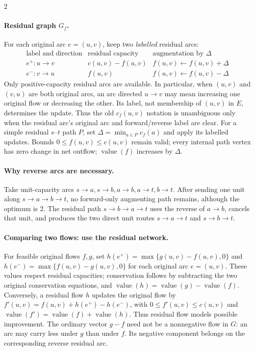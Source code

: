 \documentclass[8pt]{extarticle}
\theoremstyle{definition}
\begin{document}
\begin{multicols*}{2}
\paragraph{Residual graph $G_f$.}
For each original arc $e=(u,v)$, keep two \emph{labelled} residual arcs:
\[
\begin{array}{c|c|c}
\text{label and direction}&\text{residual capacity}&\text{augmentation by }\Delta\\\hline
 e^+:u\to v&c(u,v)-f(u,v)&f(u,v)\gets f(u,v)+\Delta\\
 e^-:v\to u&f(u,v)&f(u,v)\gets f(u,v)-\Delta
\end{array}
\]
Only positive-capacity residual arcs are available. In particular, when
$(u,v)$ and $(v,u)$ are both original arcs, an arc directed $u\to v$ may
mean increasing one original flow or decreasing the other. Its label, not
membership of $(u,v)$ in $E$, determines the update. Thus the old
$c_f(u,v)$ notation is unambiguous only when the residual arc's original
arc and forward/reverse label are clear.
For a simple residual $s$--$t$ path $P$, set
$\Delta=\min_{a\in P}c_f(a)$ and apply its labelled updates.
Bounds $0\le f(u,v)\le c(u,v)$ remain valid; every internal path vertex has
zero change in net outflow; $\operatorname{value}(f)$ increases by $\Delta$.

\paragraph{Why reverse arcs are necessary.}
Take unit-capacity arcs $s\to a,s\to b,a\to b,a\to t,b\to t$.
After sending one unit along $s\to a\to b\to t$, no forward-only
augmenting path remains, although the optimum is 2. The residual path
$s\to b\to a\to t$ uses the reverse of $a\to b$, cancels that unit, and
produces the two direct unit routes $s\to a\to t$ and $s\to b\to t$.

\paragraph{Comparing two flows: use the residual network.}
For feasible original flows $f,g$, set
$h(e^+)=\max\{g(u,v)-f(u,v),0\}$ and
$h(e^-)=\max\{f(u,v)-g(u,v),0\}$ for each original arc $e=(u,v)$.
These values respect residual capacities;
conservation follows by subtracting the two original conservation equations,
and $\operatorname{value}(h)=\operatorname{value}(g)-\operatorname{value}(f)$.
Conversely, a residual flow $h$ updates the original flow by
$f'(u,v)=f(u,v)+h(e^+)-h(e^-)$, with $0\le f'(u,v)\le c(u,v)$ and
$\operatorname{value}(f')=\operatorname{value}(f)+\operatorname{value}(h)$.
Thus residual flow models possible improvement.
The ordinary vector $g-f$ need not be a nonnegative flow in $G$: an arc may
carry less under $g$ than under $f$. Its negative component belongs on the
corresponding reverse residual arc.


\end{multicols*}
\end{document}
